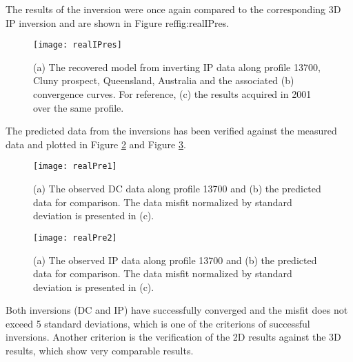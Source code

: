 The results of the inversion were once again compared to the corresponding 3D IP inversion \cite[]{Rutley01} and are shown in Figure ref{fig:realIPres}.
%
\begin{figure}
\centering
\texttt{[image: realIPres]}
\caption{(a) The recovered model from inverting IP data along profile 13700, Cluny prospect, Queensland, Australia and the associated (b) convergence curves. For reference, (c) the  results acquired in 2001 over the same profile.}
\label{fig:realIPres}
\end{figure}

The predicted data from the inversions has been verified against the measured data and plotted in Figure \ref{fig:realPre1} and Figure \ref{fig:realPre2}.
%
\begin{figure}
\centering
\texttt{[image: realPre1]}
\caption{(a) The observed DC data along profile 13700 and (b) the predicted data for comparison. The data misfit normalized by standard deviation is presented in (c).}
\label{fig:realPre1}
\end{figure}
%
\begin{figure}
\centering
\texttt{[image: realPre2]}
\caption{(a) The observed IP data along profile 13700 and (b) the predicted data for comparison. The data misfit normalized by standard deviation is presented in (c).}
\label{fig:realPre2}
\end{figure}
%
Both inversions (DC and IP) have successfully converged and the misfit does not exceed 5 standard deviations, which is one of the criterions of successful inversions. Another criterion is the verification of the 2D results against the 3D results, which show very comparable results.
